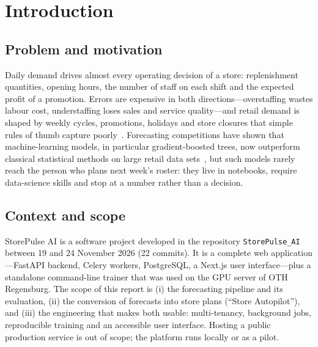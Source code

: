 \documentclass[conference]{IEEEtran}
\newcommand{\code}[1]{\texttt{\small #1}}
\begin{document}
\section{Introduction}\label{sec:intro}

\subsection{Problem and motivation}
Daily demand drives almost every operating decision of a store: replenishment quantities, opening
hours, the number of staff on each shift and the expected profit of a promotion. Errors are
expensive in both directions---overstaffing wastes labour cost, understaffing loses sales and
service quality---and retail demand is shaped by weekly cycles, promotions, holidays and store
closures that simple rules of thumb capture poorly~\cite{fildes2022retail}. Forecasting competitions
have shown that machine-learning models, in particular gradient-boosted trees, now outperform
classical statistical methods on large retail data sets~\cite{makridakis2022m5}, but such models
rarely reach the person who plans next week's roster: they live in notebooks, require data-science
skills and stop at a number rather than a decision.

\subsection{Context and scope}
StorePulse AI is a software project developed in the repository \code{StorePulse\_AI} between
19 and 24 November 2026 (22 commits). It is a complete web application---FastAPI backend, Celery
workers, PostgreSQL, a Next.js user interface---plus a standalone command-line trainer that was
used on the GPU server of OTH Regensburg. The scope of this report is (i) the forecasting pipeline
and its evaluation, (ii) the conversion of forecasts into store plans (``Store Autopilot''), and
(iii) the engineering that makes both usable: multi-tenancy, background jobs, reproducible
training and an accessible user interface. Hosting a public production service is out of scope;
the platform runs locally or as a pilot.
\end{document}
